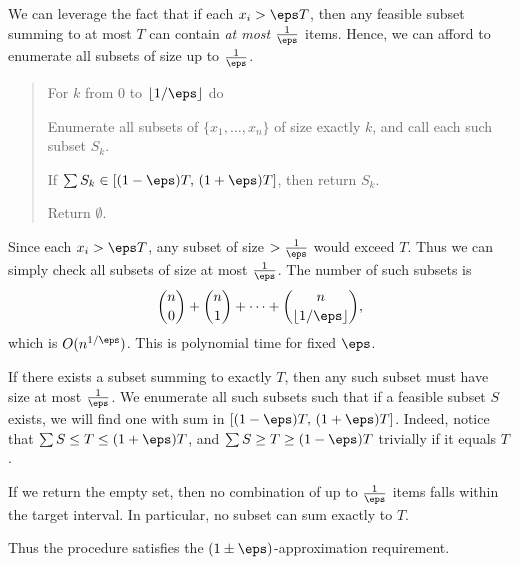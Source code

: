 \documentclass{article}
\begin{document}
\begin{solution}
  We can leverage the fact that if each $x_i > \eps T$, then any feasible subset summing to at most $T$ can contain \emph{at most} $\tfrac{1}{\eps}$ items.
  Hence, we can afford to enumerate all subsets of size up to $\frac{1}{\eps}$.

  \begin{quote}


  \begin{steps}
    \item For $k$ from 0 to $\lfloor 1/\eps \rfloor$ do
    \begin{steps}
      \item Enumerate all subsets of $\{x_1,\dots,x_n\}$ of size exactly $k$, and call each such subset $S_k$.
      \item If $\sum S_k \in [(1-\eps)T,\,(1+\eps)T]$, then return $S_k$.
    \end{steps}
    \item Return $\emptyset$.
  \end{steps}
  \end{quote}

  \begin{subproof}[Runtime]
  Since each $x_i > \eps T$, any subset of size $ >\frac{1}{\eps}$ would exceed $T$.
  Thus we can simply check all subsets of size at most $\frac{1}{\eps}$.
  The number of such subsets is
  \[
  \binom{n}{0} + \binom{n}{1} + \cdots + \binom{n}{\lfloor 1/\eps \rfloor},
  \]
  which is $O(n^{1/\eps})$.
  This is polynomial time for fixed $\eps$.
  \end{subproof}

  \begin{subproof}[Correctness]
    If there exists a subset summing to exactly $T$, then any such subset must have size at most $\frac{1}{\eps}$.
    We enumerate all such subsets such that if a feasible subset $S$ exists, we will find one with sum in $[(1-\eps)T,\,(1+\eps)T]$.
    Indeed, notice that $\sum S \leq T \leq (1+\eps)T$, and $\sum S \geq T \geq (1-\eps)T$ trivially if it equals $T$.

    If we return the empty set, then no combination of up to $\frac{1}{\eps}$ items falls within the target interval.
    In particular, no subset can sum exactly to $T$.

    Thus the procedure satisfies the $(1 \pm \eps)$-approximation requirement.
  \end{subproof}
\end{solution}
\pagebreak
\end{document}
